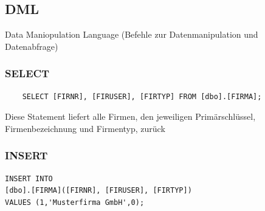 \documentclass[a4paper,10pt]{scrartcl}
\begin{document}
\subsection{DML}
Data Maniopulation Language (Befehle zur Datenmanipulation und Datenabfrage)
\subsubsection{SELECT}
\begin{verbatim}
    SELECT [FIRNR], [FIRUSER], [FIRTYP] FROM [dbo].[FIRMA];
\end{verbatim}
Diese Statement liefert alle Firmen, den jeweiligen Primärschlüssel, Firmenbezeichnung und Firmentyp, zurück
\subsubsection{INSERT}
\begin{verbatim}
INSERT INTO 
[dbo].[FIRMA]([FIRNR], [FIRUSER], [FIRTYP]) 
VALUES (1,'Musterfirma GmbH',0);
\end{verbatim}
\end{document}
